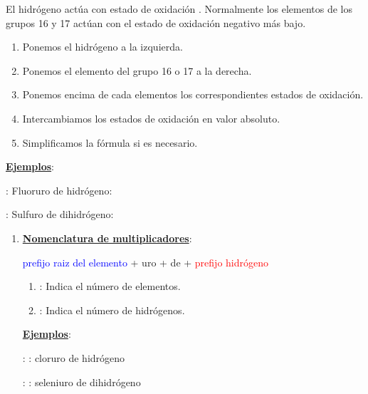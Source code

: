 \documentclass[11pt, a4paper]{article}
\begin{document}
El hidrógeno actúa con estado de oxidación . Normalmente los elementos de los grupos 16 y 17 actúan con el estado de oxidación negativo más bajo.

\vspace*{2mm}
\begin{enumerate}[label=\itembolascolor{\arabic*}{green!40!black}]
    \item Ponemos el hidrógeno a la izquierda.
    \item Ponemos el elemento del grupo 16 o 17 a la derecha.
    \item Ponemos encima de cada elementos los correspondientes estados de oxidación.
    \item Intercambiamos los estados de oxidación en valor absoluto.
    \item Simplificamos la fórmula si es necesario.
\end{enumerate}

\textbf{\uline{Ejemplos}}:

 : Fluoruro de hidrógeno: 

 : Sulfuro de dihidrógeno: 

\vspace*{2mm}

\begin{enumerate}[label=\itembolascolor{\arabic*}{blue}]
    \item \textbf{\uline{Nomenclatura de multiplicadores}}:
          \begin{center}
              \textcolor{blue}{prefijo} \textcolor{blue}{raiz del elemento} + \textcolor{mygreen}{uro} + de + \textcolor{red}{prefijo} \textcolor{red}{hidrógeno}
          \end{center}
          \begin{enumerate}[label=\textcolor{red}{$\bullet$}]
              \item {}: Indica el número de elementos.
              \item {}: Indica el número de hidrógenos.
          \end{enumerate}

          \textbf{\uline{Ejemplos}}:

           : : cloruro de hidrógeno

           : : seleniuro de dihidrógeno

\end{enumerate}
\end{document}
